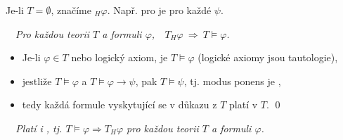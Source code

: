     Je-li $T=\emptyset$, značíme $_H \varphi$. Např. pro  je  pro každé $\psi$.
    
    \vspace{-4mm}
    {\bf {}}\ \ {\it  Pro každou teorii $T$ a formuli $\varphi$,\ \ $T_H \varphi\ \Rightarrow\ T\models \varphi$.}
    \smallskip
    
    {\it {}}
    \begin{itemize}
    \item Je-li $\varphi\in T$ nebo logický axiom, je $T \models \varphi$ (logické axiomy jsou tautologie),
    \item jestliže $T \models \varphi$ a $T \models \varphi \to \psi$, pak $T \models \psi$, tj. modus ponens je ,
    \item tedy každá formule vyskytující se v důkazu z $T$ platí v $T$. \qed
\end{itemize}
    \medskip
    
    {\it {}\ \ Platí i , tj. $T\models \varphi \Rightarrow T_H \varphi$ pro každou teorii $T$ a formuli $\varphi$.}



